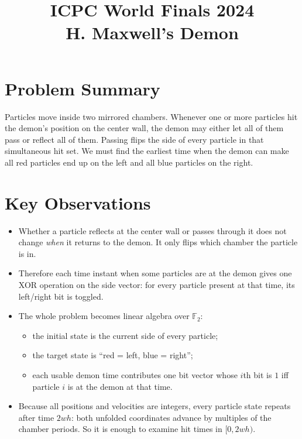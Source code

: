 \documentclass[11pt]{article}
\title{ICPC World Finals 2024\\H. Maxwell’s Demon}
\author{}
\date{}
\begin{document}
\maketitle

\section*{Problem Summary}

Particles move inside two mirrored chambers. Whenever one or more particles hit the demon's position on the center wall, the demon may either let all of them pass or reflect all of them. Passing flips the side of every particle in that simultaneous hit set. We must find the earliest time when the demon can make all red particles end up on the left and all blue particles on the right.

\section*{Key Observations}

\begin{itemize}[leftmargin=*]
    \item Whether a particle reflects at the center wall or passes through it does not change \emph{when} it returns to the demon. It only flips which chamber the particle is in.
    \item Therefore each time instant when some particles are at the demon gives one XOR operation on the side vector: for every particle present at that time, its left/right bit is toggled.
    \item The whole problem becomes linear algebra over $\mathbb{F}_2$:
    \begin{itemize}[leftmargin=*]
        \item the initial state is the current side of every particle;
        \item the target state is ``red = left, blue = right'';
        \item each usable demon time contributes one bit vector whose $i$th bit is $1$ iff particle $i$ is at the demon at that time.
    \end{itemize}
    \item Because all positions and velocities are integers, every particle state repeats after time $2wh$: both unfolded coordinates advance by multiples of the chamber periods. So it is enough to examine hit times in $[0,2wh)$.
\end{itemize}
\end{document}
